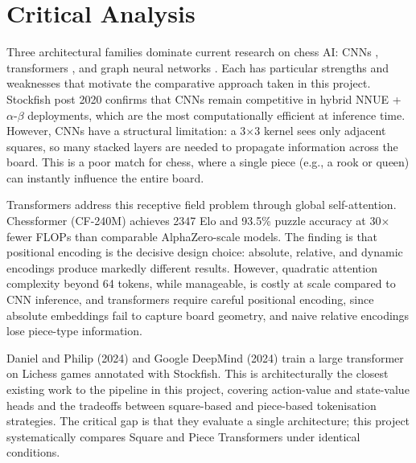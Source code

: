 \section{Critical Analysis}

Three architectural families dominate current research on chess AI: CNNs \cite{deep_chess_paper}, transformers \cite{chessformer} \cite{searchless_chess}, and graph neural networks \cite{gnn_chess} \cite{gnn_chess_modelling}. Each has particular strengths and weaknesses that motivate the comparative approach taken in this project. Stockfish post 2020 confirms that CNNs remain competitive in hybrid NNUE + $\alpha$-$\beta$ deployments, which are the most computationally efficient at inference time. However, CNNs have a structural limitation: a 3$\times$3 kernel sees only adjacent squares, so many stacked layers are needed to propagate information across the board. This is a poor match for chess, where a single piece (e.g., a rook or queen) can instantly influence the entire board.

Transformers address this receptive field problem through global self-attention. Chessformer (CF-240M) \cite{chessformer} achieves 2347 Elo and 93.5\% puzzle accuracy at 30$\times$ fewer FLOPs than comparable AlphaZero-scale models. The finding is that positional encoding is the decisive design choice: absolute, relative, and dynamic encodings produce markedly different results. However, quadratic attention complexity beyond 64 tokens, while manageable, is costly at scale compared to CNN inference, and transformers require careful positional encoding, since absolute embeddings fail to capture board geometry, and naive relative encodings lose piece-type information.

Daniel and Philip (2024) \cite{chessformer} and Google DeepMind (2024) \cite{searchless_chess} train a large transformer on Lichess games annotated with Stockfish. This is architecturally the closest existing work to the pipeline in this project, covering action-value and state-value heads and the tradeoffs between square-based and piece-based tokenisation strategies. The critical gap is that they evaluate a single architecture; this project systematically compares Square and Piece Transformers under identical conditions.


